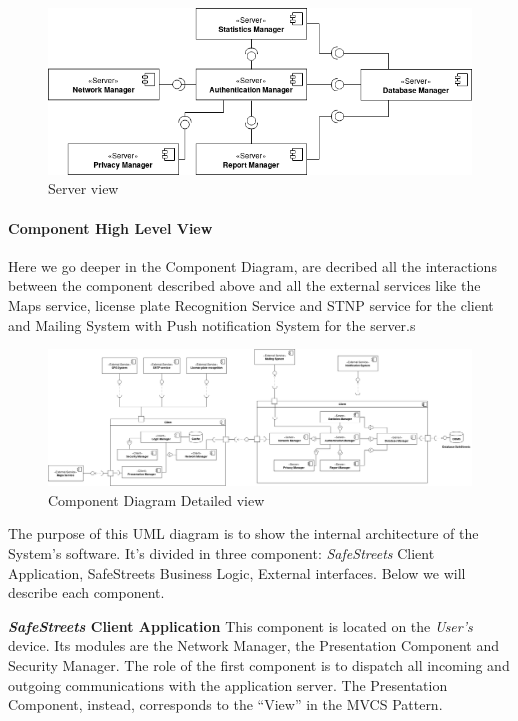 \documentclass{article}
\begin{document}
\begin{figure}[H]
    \centering
    \includegraphics[scale=0.4]{img/component_diagrams/server_component.png}
    \caption{Server view}
\end{figure}

\paragraph{Component High Level View}
Here we go deeper in the Component Diagram, are decribed all the interactions between the component
described above and all the external services like the Maps service, license plate Recognition Service and 
STNP service for the client and Mailing System with Push notification System for the server.s 

\begin{figure}[H]
    \includegraphics[width=1.2\textwidth, left]{img/component_diagrams/component_diagram_complete.png}
    \caption{Component Diagram Detailed view}
\end{figure}

The purpose of this UML diagram is to show the internal architecture of the System's software. It's divided in 
three component: \textit{SafeStreets} Client Application, SafeStreets Business Logic, External interfaces.
Below we will describe each component. 

\textbf{ \textit{SafeStreets} Client Application }
This component is located on the \textit{User's} device. Its modules are the Network Manager, the Presentation 
Component and Security Manager. The role of the first component is 
to dispatch all incoming and outgoing communications with the application server. The Presentation Component, 
instead, corresponds to the “View” in the MVCS Pattern.
\end{document}
